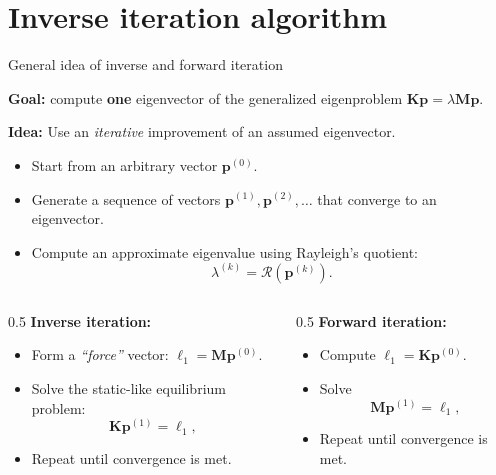 \documentclass[aspectratio=169]{beamer}
\begin{document}
\section{Inverse iteration algorithm}

\begin{frame}{General idea of inverse and forward iteration}
  \vspace{-0.2cm}
  \small
  \begin{block}{}
    \textbf{Goal:} compute \textbf{one} eigenvector of the generalized eigenproblem \( \mathbf K\mathbf p = \lambda\mathbf M \mathbf p \).
  \end{block}
  \textbf{Idea:} Use an \emph{iterative} improvement of an assumed eigenvector.
  \begin{itemize}
    \item Start from an arbitrary vector $\mathbf p^{(0)}$.
    \item Generate a sequence of vectors $\mathbf p^{(1)}, \mathbf p^{(2)}, \dots$ that converge to an eigenvector.
    \item  Compute an approximate eigenvalue using Rayleigh's quotient:
          \[
            \lambda^{(k)} = \mathcal R(\mathbf p^{(k)}).
          \]
  \end{itemize}
  \begin{columns}[T]
    \begin{column}{0.5\textwidth}
      \textbf{Inverse iteration:}
      \begin{itemize}
        \item Form a \emph{“force”} vector:
              \(
              \boldsymbol \ell_1 = \mathbf M \mathbf p^{(0)}.
              \)
        \item Solve the static-like equilibrium problem:
              \[
                \mathbf K \mathbf p^{(1)} = \boldsymbol \ell_1,
              \]
        \item Repeat until convergence is met.
      \end{itemize}
    \end{column}
    \begin{column}{0.5\textwidth}
      \textbf{Forward iteration:}
      \begin{itemize}
        \item Compute $\boldsymbol \ell_1 = \mathbf K \mathbf p^{(0)}$.
        \item Solve
              \[
                \mathbf M \mathbf p^{(1)} = \boldsymbol \ell_1 ,
              \]
        \item Repeat until convergence is met.
      \end{itemize}
    \end{column}
  \end{columns}
\end{frame}
\end{document}
